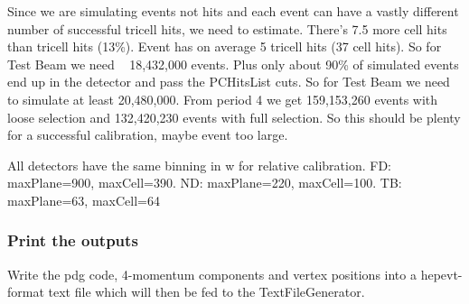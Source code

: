 \documentclass[12pt]{article}
\begin{document}
Since we are simulating events not hits and each event can have a vastly different number of successful tricell hits, we need to estimate. There's 7.5 more cell hits than tricell hits (13\%). Event has on average 5 tricell hits (37 cell hits).
So for Test Beam we need ~ 18,432,000 events.
Plus only about 90\% of simulated events end up in the detector and pass the PCHitsList cuts.
So for Test Beam we need to simulate at least 20,480,000. From period 4 we get 159,153,260 events with loose selection and 132,420,230 events with full selection. So this should be plenty for a successful calibration, maybe event too large.

All detectors have the same binning in w for relative calibration.
FD: maxPlane=900, maxCell=390. ND: maxPlane=220, maxCell=100. TB: maxPlane=63, maxCell=64

\subsubsection{Print the outputs}
Write the pdg code, 4-momentum components and vertex positions into a hepevt-format text file which will then be fed to the TextFileGenerator.
\end{document}

